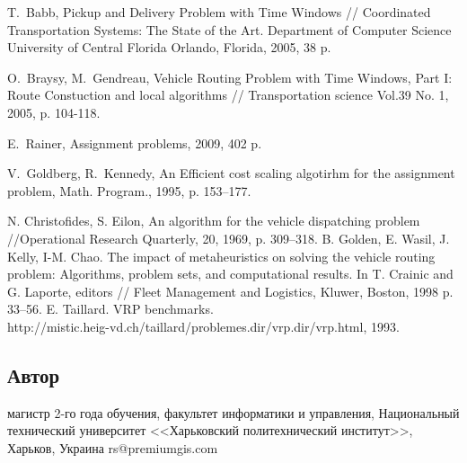 \documentclass[]{TAACpaper}
\begin{document}
\begin{thebibliography}{99}

 T.~Babb, Pickup and Delivery Problem with Time Windows // Coordinated Transportation Systems: The State of the Art. Department of Computer Science University of Central Florida Orlando, Florida, 2005, 38 p.

 O.~Braysy, M.~Gendreau, Vehicle Routing Problem with Time Windows, Part I: Route Constuction and local algorithms // Transportation science Vol.39 No. 1, 2005, p. 104-118.

 E.~Rainer, Assignment problems, 2009, 402 p. 

 V.~Goldberg, R.~Kennedy, An Efficient cost scaling algotirhm for the assignment problem, Math. Program., 1995, p. 153--177.  

  N. Christofides, S. Eilon, An algorithm for the vehicle dispatching problem //Operational Research Quarterly, 20, 1969, p. 309–318.
  B. Golden, E. Wasil, J. Kelly, I-M. Chao. The impact of metaheuristics on solving the vehicle routing problem: Algorithms, problem sets, and computational results. In T. Crainic and G. Laporte, editors // Fleet Management and Logistics, Kluwer, Boston, 1998 p. 33–56.
  E. Taillard. VRP benchmarks.\\ http://mistic.heig-vd.ch/taillard/problemes.dir/vrp.dir/vrp.html, 1993.
\end{thebibliography}

\subsection{Автор}
\author{Роман Александрович Шафеев}{магистр 2-го года обучения, факультет информатики и управления, Национальный технический университет <<Харьковский политехнический институт>>, Харьков, Украина}
{rs@premiumgis.com}
\end{document}
